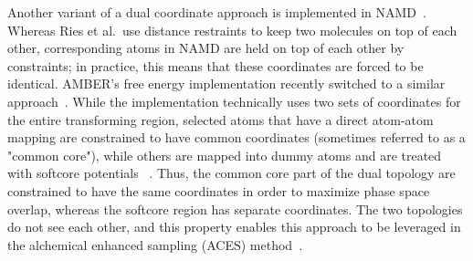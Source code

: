 \documentclass[9pt,bestpractices]{livecoms}
\begin{document}
Another variant of a dual coordinate approach is implemented in NAMD~\cite{jiang2019computing}. Whereas Ries et al.~use distance restraints to keep two molecules on top of each other, corresponding atoms in NAMD are held on top of each other by constraints; in practice, this means that these coordinates are forced to be identical. AMBER's free energy implementation recently switched to a similar approach~\cite{lee2023aces,York_ACSPhysChemAu_2023_v3_p478}.
While the implementation technically uses two sets of coordinates for the entire transforming region, selected atoms that have a direct atom-atom mapping are constrained to have common coordinates (sometimes referred to as a "common core"), while others are mapped into dummy atoms and are treated with softcore potentials~\cite{Lee_JChemTheoryComput_2020_v16_p5512,tsai2023amber} .  Thus, the common core part of the dual topology are constrained to have the same coordinates in order to maximize phase space overlap, whereas the softcore region has separate coordinates.  The two topologies do not see each other, and this property enables this approach to be leveraged in the alchemical enhanced sampling (ACES) method~\cite{lee2023aces,tsai_jcheminfmodel_2024_v64_p7046,zhang_jchemtheorycomput_2024_v20_p3935}.
\end{document}
